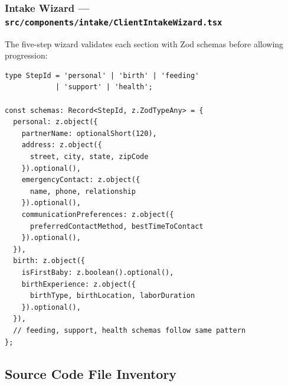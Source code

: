 \documentclass[12pt,letterpaper]{article}
\begin{document}
\subsubsection{Intake Wizard --- \texttt{src/components/intake/ClientIntakeWizard.tsx}}

The five-step wizard validates each section with Zod schemas before allowing progression:

\begin{lstlisting}[caption={Intake wizard Zod validation schemas (\texttt{ClientIntakeWizard.tsx})}]
type StepId = 'personal' | 'birth' | 'feeding'
            | 'support' | 'health';

const schemas: Record<StepId, z.ZodTypeAny> = {
  personal: z.object({
    partnerName: optionalShort(120),
    address: z.object({
      street, city, state, zipCode
    }).optional(),
    emergencyContact: z.object({
      name, phone, relationship
    }).optional(),
    communicationPreferences: z.object({
      preferredContactMethod, bestTimeToContact
    }).optional(),
  }),
  birth: z.object({
    isFirstBaby: z.boolean().optional(),
    birthExperience: z.object({
      birthType, birthLocation, laborDuration
    }).optional(),
  }),
  // feeding, support, health schemas follow same pattern
};
\end{lstlisting}

\newpage

\subsection{Source Code File Inventory}
\end{document}
